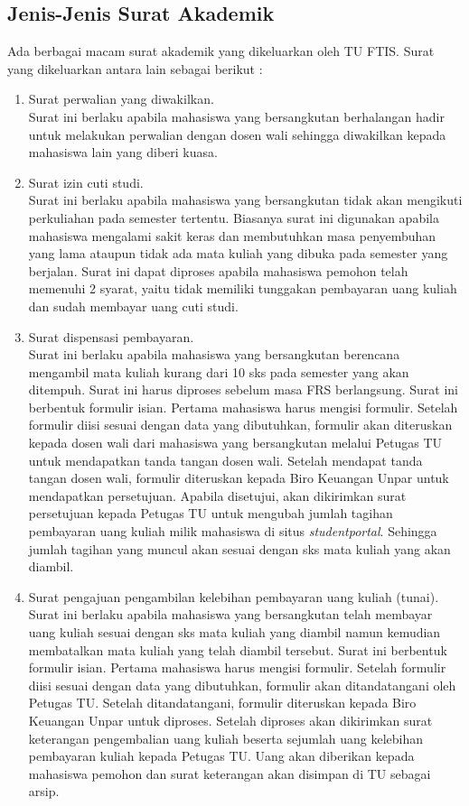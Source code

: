 \subsection{Jenis-Jenis Surat Akademik}
\label{sec:jenis_jenis_surat_akademik}
Ada berbagai macam surat akademik yang dikeluarkan oleh TU FTIS. Surat yang dikeluarkan antara lain sebagai berikut :
\begin{enumerate}
	\item Surat perwalian yang diwakilkan. \\
	Surat ini berlaku apabila mahasiswa yang bersangkutan berhalangan hadir untuk melakukan perwalian dengan dosen wali sehingga diwakilkan kepada mahasiswa lain yang diberi kuasa.
	
	\item Surat izin cuti studi. \\
	Surat ini berlaku apabila mahasiswa yang bersangkutan tidak akan mengikuti perkuliahan pada semester tertentu. Biasanya surat ini digunakan apabila mahasiswa mengalami sakit keras dan membutuhkan masa penyembuhan yang lama ataupun tidak ada mata kuliah yang dibuka pada semester yang berjalan. Surat ini dapat diproses apabila mahasiswa pemohon telah memenuhi 2 syarat, yaitu tidak memiliki tunggakan pembayaran uang kuliah dan sudah membayar uang cuti studi.
	
	\item Surat dispensasi pembayaran. \\
	Surat ini berlaku apabila mahasiswa yang bersangkutan berencana mengambil mata kuliah kurang dari 10 sks pada semester yang akan ditempuh. Surat ini harus diproses sebelum masa FRS berlangsung. Surat ini berbentuk formulir isian. Pertama mahasiswa harus mengisi formulir. Setelah formulir diisi sesuai dengan data yang dibutuhkan, formulir akan diteruskan kepada dosen wali dari mahasiswa yang bersangkutan melalui Petugas TU untuk mendapatkan tanda tangan dosen wali. Setelah mendapat tanda tangan dosen wali, formulir diteruskan kepada Biro Keuangan Unpar untuk mendapatkan persetujuan. Apabila disetujui, akan dikirimkan surat persetujuan kepada Petugas TU untuk mengubah jumlah tagihan pembayaran uang kuliah milik mahasiswa di situs \textit{studentportal}. Sehingga jumlah tagihan yang muncul akan sesuai dengan sks mata kuliah yang akan diambil. 
	
	\item Surat pengajuan pengambilan kelebihan pembayaran uang kuliah (tunai). \\
	Surat ini berlaku apabila mahasiswa yang bersangkutan telah membayar uang kuliah sesuai dengan sks mata kuliah yang diambil namun kemudian membatalkan mata kuliah yang telah diambil tersebut. Surat ini berbentuk formulir isian. Pertama mahasiswa harus mengisi formulir. Setelah formulir diisi sesuai dengan data yang dibutuhkan, formulir akan ditandatangani oleh Petugas TU. Setelah ditandatangani, formulir diteruskan kepada Biro Keuangan Unpar untuk diproses. Setelah diproses akan dikirimkan surat keterangan pengembalian uang kuliah beserta sejumlah uang kelebihan pembayaran kuliah kepada Petugas TU. Uang akan diberikan kepada mahasiswa pemohon dan surat keterangan akan disimpan di TU sebagai arsip.
	

\end{enumerate}
